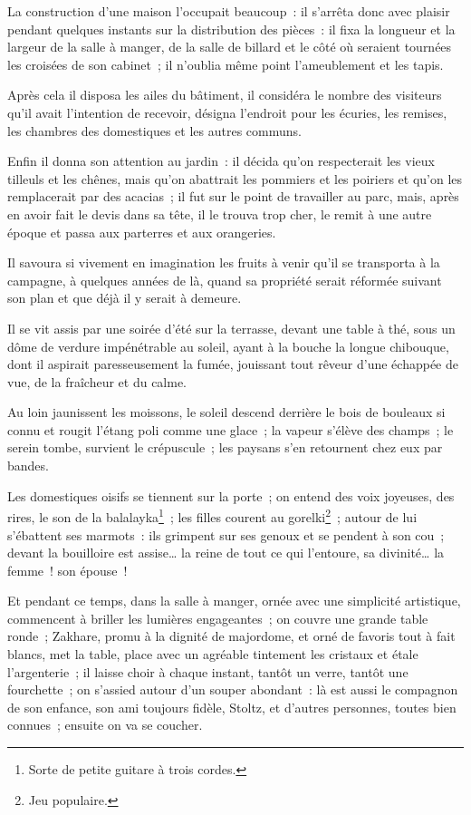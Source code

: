 \documentclass[french,twoside]{book} %
\begin{document}
La construction d’une maison l’occupait beaucoup : il s’arrêta donc avec plaisir pendant quelques instants sur la distribution des pièces : il fixa la longueur et la largeur de la salle à manger, de la salle de billard et le côté où seraient tournées les croisées de son cabinet ; il n’oublia même point l’ameublement et les tapis.\par
Après cela il disposa les ailes du bâtiment, il considéra le nombre des visiteurs qu’il avait l’intention de recevoir, désigna l’endroit pour les écuries, les remises, les chambres des domestiques et les autres communs.\par
Enfin il donna son attention au jardin : il décida qu’on respecterait les vieux tilleuls et les chênes, mais qu’on abattrait les pommiers et les poiriers et qu’on les remplacerait par des acacias ; il fut sur le point de travailler au parc, mais, après en avoir fait le devis dans sa tête, il le trouva trop cher, le remit à une autre époque et passa aux parterres et aux orangeries.\par
Il savoura si vivement en imagination les fruits à venir qu’il se transporta à la campagne, à quelques années de là, quand sa propriété serait réformée suivant son plan et que déjà il y serait à demeure.\par
Il se vit assis par une soirée d’été sur la terrasse, devant une table à thé, sous un dôme de verdure impénétrable au soleil, ayant à la bouche la longue chibouque, dont il aspirait paresseusement la fumée, jouissant tout rêveur d’une échappée de vue, de la fraîcheur et du calme.\par
Au loin jaunissent les moissons, le soleil descend derrière le bois de bouleaux si connu et rougit l’étang poli comme une glace ; la vapeur s’élève des champs ; le serein tombe, survient le crépuscule ; les paysans s’en retournent chez eux par bandes.\par
Les domestiques oisifs se tiennent sur la porte ; on entend des voix joyeuses, des rires, le son de la balalayka\footnote{Sorte de petite guitare à trois cordes.} ; les filles courent au gorelki\footnote{Jeu populaire.} ; autour de lui s’ébattent ses marmots : ils grimpent sur ses genoux et se pendent à son cou ; devant la bouilloire est assise… la reine de tout ce qui l’entoure, sa divinité… la femme ! son épouse !\par
Et pendant ce temps, dans la salle à manger, ornée avec une simplicité artistique, commencent à briller les lumières engageantes ; on couvre une grande table ronde ; Zakhare, promu à la dignité de majordome, et orné de favoris tout à fait blancs, met la table, place avec un agréable tintement les cristaux et étale l’argenterie ; il laisse choir à chaque instant, tantôt un verre, tantôt une fourchette ; on s’assied autour d’un souper abondant : là est aussi le compagnon de son enfance, son ami toujours fidèle, Stoltz, et d’autres personnes, toutes bien connues ; ensuite on va se coucher.\par
\end{document}
